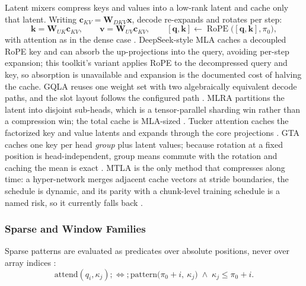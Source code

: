 Latent mixers compress keys and values into a low-rank latent and cache only that latent. Writing $\mathbf{c}_{KV} = \mathbf{W}_{DKV}\mathbf{x}$, decode re-expands and rotates per step:
\[
\mathbf{k} = \mathbf{W}_{UK}\mathbf{c}_{KV},\qquad
\mathbf{v} = \mathbf{W}_{UV}\mathbf{c}_{KV},\qquad
[\mathbf{q},\mathbf{k}] \leftarrow \operatorname{RoPE}\big([\mathbf{q},\mathbf{k}], \pi_0\big),
\]
with attention as in the dense case \citep{mehta_mla_2025}. DeepSeek-style MLA caches a decoupled RoPE key and can absorb the up-projections into the query, avoiding per-step expansion; this toolkit's variant applies RoPE to the decompressed query and key, so absorption is unavailable and expansion is the documented cost of halving the cache. GQLA reuses one weight set with two algebraically equivalent decode paths, and the slot layout follows the configured path \citep{meng_gqla_2026}. MLRA partitions the latent into disjoint sub-heads, which is a tensor-parallel sharding win rather than a compression win; the total cache is MLA-sized \citep{liu_mlra_2026}. Tucker attention caches the factorized key and value latents and expands through the core projections \citep{klein_tucker_2026}. GTA caches one key per head \emph{group} plus latent values; because rotation at a fixed position is head-independent, group means commute with the rotation and caching the mean is exact \citep{sun_gta_2025}. MTLA is the only method that compresses along time: a hyper-network merges adjacent cache vectors at stride boundaries, the schedule is dynamic, and its parity with a chunk-level training schedule is a named risk, so it currently falls back \citep{deng_mtla_2025}.

\subsubsection{Sparse and Window Families}

Sparse patterns are evaluated as predicates over absolute positions, never over array indices \citep{child_sparse_transformer_2019}:
\[
\text{attend}(q_i,\kappa_j) ;\Longleftrightarrow; \text{pattern}\big(\pi_0+i,\ \kappa_j\big) \;\wedge\; \kappa_j \le \pi_0+i .
\]

